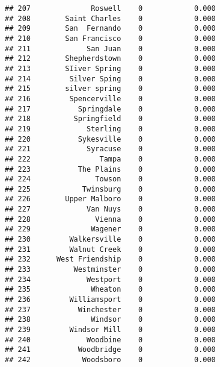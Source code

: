 \documentclass[]{article}
\newenvironment{Shaded}{\begin{snugshade}}{\end{snugshade}}
\newcommand{\KeywordTok}[1]{\textcolor[rgb]{0.13,0.29,0.53}{\textbf{#1}}}
\newcommand{\DataTypeTok}[1]{\textcolor[rgb]{0.13,0.29,0.53}{#1}}
\newcommand{\DecValTok}[1]{\textcolor[rgb]{0.00,0.00,0.81}{#1}}
\newcommand{\StringTok}[1]{\textcolor[rgb]{0.31,0.60,0.02}{#1}}
\newcommand{\OperatorTok}[1]{\textcolor[rgb]{0.81,0.36,0.00}{\textbf{#1}}}
\newcommand{\NormalTok}[1]{#1}
\begin{document}
\begin{verbatim}
## 207              Roswell    0            0.000
## 208        Saint Charles    0            0.000
## 209        San  Fernando    0            0.000
## 210        San Francisco    0            0.000
## 211             San Juan    0            0.000
## 212        Shepherdstown    0            0.000
## 213        SIiver Spring    0            0.000
## 214         Silver Sping    0            0.000
## 215        silver spring    0            0.000
## 216         Spencerville    0            0.000
## 217           Springdale    0            0.000
## 218          Springfield    0            0.000
## 219             Sterling    0            0.000
## 220           Sykesville    0            0.000
## 221             Syracuse    0            0.000
## 222                Tampa    0            0.000
## 223           The Plains    0            0.000
## 224               Towson    0            0.000
## 225            Twinsburg    0            0.000
## 226        Upper Malboro    0            0.000
## 227             Van Nuys    0            0.000
## 228               Vienna    0            0.000
## 229              Wagener    0            0.000
## 230         Walkersville    0            0.000
## 231         Walnut Creek    0            0.000
## 232      West Friendship    0            0.000
## 233          Westminster    0            0.000
## 234             Westport    0            0.000
## 235              Wheaton    0            0.000
## 236         Williamsport    0            0.000
## 237           Winchester    0            0.000
## 238              Windsor    0            0.000
## 239         Windsor Mill    0            0.000
## 240             Woodbine    0            0.000
## 241           Woodbridge    0            0.000
## 242            Woodsboro    0            0.000
\end{verbatim}

\begin{Shaded}
\end{Shaded}
\end{document}
